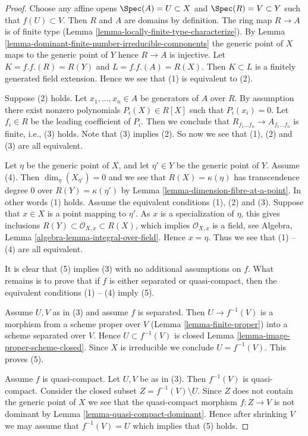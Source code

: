 \begin{proof}
Choose any affine opens $\Spec(A) = U \subset X$
and $\Spec(R) = V \subset Y$ such that $f(U) \subset V$.
Then $R$ and $A$ are domains by definition. The ring map
$R \to A$ is of finite type
(Lemma \ref{lemma-locally-finite-type-characterize}).
By Lemma \ref{lemma-dominant-finite-number-irreducible-components}
the generic point of $X$ maps to the generic point of $Y$
hence $R \to A$ is injective.
Let $K = f.f.(R) = R(Y)$ and $L = f.f.(A) = R(X)$. Then $K \subset L$
is a finitely generated field extension. Hence we see that
(1) is equivalent to (2).

\medskip\noindent
Suppose (2) holds. Let $x_1, \ldots, x_n \in A$ be generators
of $A$ over $R$. By assumption there exist nonzero polynomials
$P_i(X) \in R[X]$ such that $P_i(x_i) = 0$. Let $f_i \in R$ be the
leading coefficient of $P_i$. Then we conclude that
$R_{f_1 \ldots f_n} \to A_{f_1 \ldots f_n}$ is finite, i.e., (3) holds.
Note that (3) implies (2). So now we see that (1), (2) and (3) are all
equivalent.

\medskip\noindent
Let $\eta$ be the generic point of $X$, and let $\eta' \in Y$ be the
generic point of $Y$. Assume (4). Then
$\dim_\eta(X_{\eta'}) = 0$ and we see that $R(X) = \kappa(\eta)$ has
transcendence degree $0$ over $R(Y) = \kappa(\eta')$ by
Lemma \ref{lemma-dimension-fibre-at-a-point}.
In other words (1) holds. Assume the equivalent conditions (1), (2) and
(3). Suppose that $x \in X$ is a point mapping to $\eta'$.
As $x$ is a specialization of $\eta$,
this gives inclusions $R(Y) \subset \mathcal{O}_{X, x} \subset R(X)$,
which implies $\mathcal{O}_{X, x}$ is a field, see
Algebra, Lemma \ref{algebra-lemma-integral-over-field}.
Hence $x = \eta$. Thus we see that (1) -- (4)
are all equivalent.

\medskip\noindent
It is clear that (5) implies (3) with no additional assumptions on
$f$. What remains is to prove that if $f$ is either separated or
quasi-compact, then the equivalent conditions (1) -- (4) imply (5).

\medskip\noindent
Assume $U, V$ as in (3) and assume $f$ is separated.
Then $U \to f^{-1}(V)$ is a morphism from a scheme proper over $V$
(Lemma \ref{lemma-finite-proper})
into a scheme separated over $V$.
Hence $U \subset f^{-1}(V)$ is closed
Lemma \ref{lemma-image-proper-scheme-closed}.
Since $X$ is irreducible we conclude $U = f^{-1}(V)$. This
proves (5).

\medskip\noindent
Assume $f$ is quasi-compact. Let $U, V$ be as in (3).
Then $f^{-1}(V)$ is quasi-compact. Consider the closed subset
$Z = f^{-1}(V) \setminus U$. Since $Z$ does not contain the
generic point of $X$ we see that the quasi-compact morphism
$f : Z \to V$ is not dominant by
Lemma \ref{lemma-quasi-compact-dominant}.
Hence after shrinking $V$ we may assume that $f^{-1}(V) = U$
which implies that (5) holds.
\end{proof}

